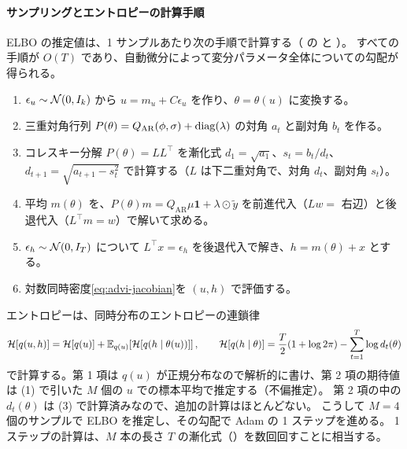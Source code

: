 \paragraph{サンプリングとエントロピーの計算手順}
ELBO の推定値は、1 サンプルあたり次の手順で計算する（ の  と ）。
すべての手順が $O(T)$ であり、自動微分によって変分パラメータ全体についての勾配が得られる。
\begin{enumerate}[label=(\arabic*)]
  \item $\epsilon_u \sim \mathcal{N}(0, I_k)$ から $u = m_u + C\epsilon_u$ を作り、$\theta = \theta(u)$ に変換する。
  \item 三重対角行列 $P(\theta) = Q_{\mathrm{AR}}(\phi, \sigma) + \mathrm{diag}(\lambda)$ の対角 $a_t$ と副対角 $b_t$ を作る。
  \item コレスキー分解 $P(\theta) = L L^\top$ を漸化式
    $d_1 = \sqrt{a_1}$、$s_t = b_t / d_t$、$d_{t+1} = \sqrt{a_{t+1} - s_t^2}$
    で計算する（$L$ は下二重対角で、対角 $d_t$、副対角 $s_t$）。
  \item 平均 $m(\theta)$ を、$P(\theta) m = Q_{\mathrm{AR}}\mu\mathbf{1} + \lambda \odot \tilde y$ を前進代入（$L w = $ 右辺）と後退代入（$L^\top m = w$）で解いて求める。
  \item $\epsilon_h \sim \mathcal{N}(0, I_T)$ について $L^\top x = \epsilon_h$ を後退代入で解き、$h = m(\theta) + x$ とする。
  \item 対数同時密度\cref{eq:advi-jacobian}を $(u, h)$ で評価する。
\end{enumerate}
エントロピーは、同時分布のエントロピーの連鎖律
\[
  \mathcal{H}[q(u, h)] = \mathcal{H}[q(u)] + \mathbb{E}_{q(u)}\!\left[\mathcal{H}[q(h \mid \theta(u))]\right], \qquad
  \mathcal{H}[q(h \mid \theta)] = \frac{T}{2}(1 + \log 2\pi) - \sum_{t=1}^{T} \log d_t(\theta)
\]
で計算する。第 1 項は $q(u)$ が正規分布なので解析的に書け、第 2 項の期待値は (1) で引いた $M$ 個の $u$ での標本平均で推定する（不偏推定）。
第 2 項の中の $d_t(\theta)$ は (3) で計算済みなので、追加の計算はほとんどない。
こうして $M = 4$ 個のサンプルで ELBO を推定し、その勾配で Adam の 1 ステップを進める。
1 ステップの計算は、$M$ 本の長さ $T$ の漸化式（）を数回回すことに相当する。

